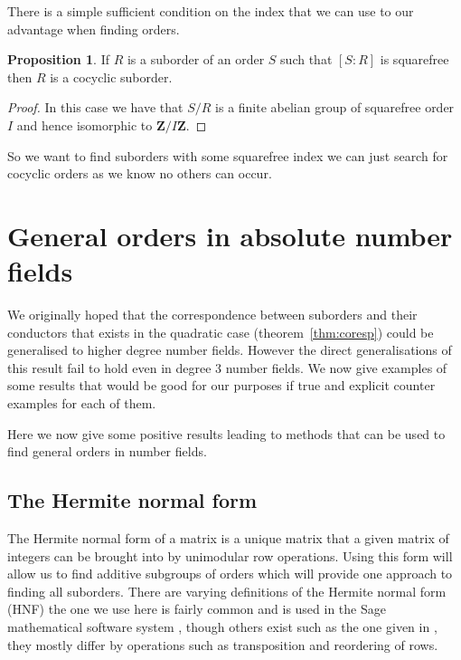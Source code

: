 \documentclass[12pt,a4paper,abstracton,bibtotoc]{scrreprt}
\theoremstyle{definition}
\newtheorem{prop}{Proposition}
\newcommand{\ZZ}{\mathbf{Z}}
\begin{document}
There is a simple sufficient condition on the index that we can use to our advantage when finding orders.

\begin{prop}
If $R$ is a suborder of an order $S$ such that $[S:R]$ is squarefree then $R$ is a cocyclic suborder.
\end{prop}

\begin{proof}
In this case we have that $S/R$ is a finite abelian group of squarefree order $I$ and hence isomorphic to $\ZZ/I\ZZ$.
\end{proof}

So we want to find suborders with some squarefree index we can just search for cocyclic orders as we know no others can occur.

\section{General orders in absolute number fields}

We originally hoped that the correspondence between suborders and their conductors that exists in the quadratic case (theorem~\ref{thm:coresp}) could be generalised to higher degree number fields.
However the direct generalisations of this result fail to hold even in degree 3 number fields.
We now give examples of some results that would be good for our purposes if true and explicit counter examples for each of them.

Here we now give some positive results leading to methods that can be used to find general orders in number fields.

\subsection{The Hermite normal form}
The Hermite normal form of a matrix is a unique matrix that a given matrix of integers can be brought into by unimodular row operations.
Using this form will allow us to find additive subgroups of orders which will provide one approach to finding all suborders.
There are varying definitions of the Hermite normal form (HNF) the one we use here is fairly common and is used in the Sage mathematical software system \cite{sage}, though others exist such as the one given in \cite{cohen93}, they mostly differ by operations such as transposition and reordering of rows.
\end{document}
